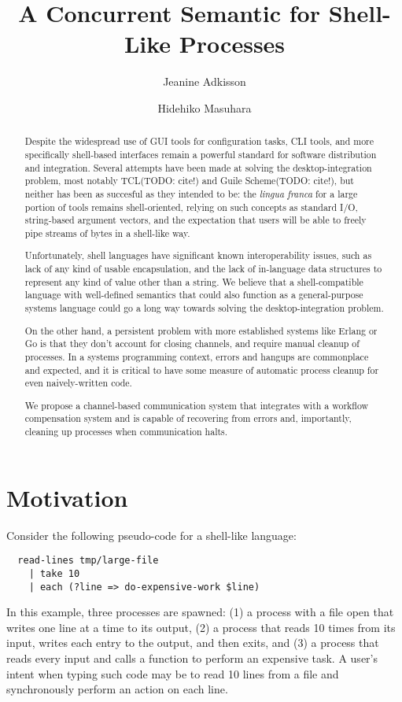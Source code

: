 \documentclass[format=sigconf, review=true, draft=true, screen=true]{acmart}
\title{A Concurrent Semantic for Shell-Like Processes}
\author{Jeanine Adkisson}
\affiliation{Tokyo Institute of Technology}
\author{Hidehiko Masuhara}
\affiliation{Tokyo Institute of Technology}
\begin{document}
\begin{abstract}
Despite the widespread use of GUI tools for configuration tasks, CLI tools, and more specifically shell-based interfaces remain a powerful standard for software distribution and integration. Several attempts have been made at solving the desktop-integration problem, most notably TCL(TODO: cite!) and Guile Scheme(TODO: cite!), but neither has been as succesful as they intended to be: the \emph{lingua franca} for a large portion of tools remains shell-oriented, relying on such concepts as standard I/O, string-based argument vectors, and the expectation that users will be able to freely pipe streams of bytes in a shell-like way.

Unfortunately, shell languages have significant known interoperability issues, such as lack of any kind of usable encapsulation, and the lack of in-language data structures to represent any kind of value other than a string. We believe that a shell-compatible language with well-defined semantics that could also function as a general-purpose systems language could go a long way towards solving the desktop-integration problem.

On the other hand, a persistent problem with more established systems like Erlang or Go is that they don't account for closing channels, and require manual cleanup of processes. In a systems programming context, errors and hangups are commonplace and expected, and it is critical to have some measure of automatic process cleanup for even naively-written code.

We propose a channel-based communication system that integrates with a workflow compensation system and is capable of recovering from errors and, importantly, cleaning up processes when communication halts.
\end{abstract}
\maketitle

\section{Motivation}

Consider the following pseudo-code for a shell-like language:

\begin{verbatim}
  read-lines tmp/large-file
    | take 10
    | each (?line => do-expensive-work $line)
\end{verbatim}
In this example, three processes are spawned: (1) a process with a file open that writes one line at a time to its output, (2) a process that reads 10 times from its input, writes each entry to the output, and then exits, and (3) a process that reads every input and calls a function to perform an expensive task.
A user's intent when typing such code may be to read 10 lines from a file and synchronously perform an action on each line.
\end{document}
